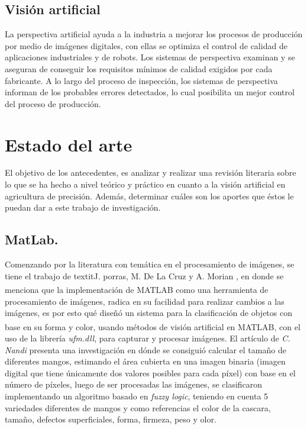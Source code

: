\section{Visión artificial} La perspectiva artificial ayuda a la industria a mejorar los procesos de producción por medio de imágenes digitales, con ellas se optimiza el control de calidad de aplicaciones industriales y de robots. Los sistemas de perspectiva examinan y se aseguran de conseguir los requisitos mínimos de calidad exigidos por cada fabricante. A lo largo del proceso de inspección, los sistemas de perspectiva informan de los probables errores detectados, lo cual posibilita un mejor control del proceso de producción.

\chapter{Estado del arte}

	El objetivo de los antecedentes, es analizar y realizar una revisión literaria sobre lo  que  se  ha hecho  a  nivel  teórico  y  práctico  en  cuanto a  la visión artificial en agricultura de precisión.  Además,  determinar  cuáles son los aportes que éstos le puedan dar a este trabajo de investigación.


\section{MatLab.}

	Comenzando por la literatura con temática en el procesamiento de imágenes, se tiene el trabajo de textit{J. porras, M. De La Cruz y A. Morian} \cite{article3}, en donde se menciona que la implementación de MATLAB\textsuperscript{\textregistered} como una herramienta de procesamiento de imágenes, radica en su facilidad para realizar cambios a las imágenes, es por esto qué diseñó un sistema para la clasificación de objetos con base en su forma y color, usando métodos de visión artificial en MATLAB\textsuperscript{\textregistered}, con el uso de la librería \textit{ufm.dll}, para capturar y procesar imágenes. El artículo de \textit{C. Nandi} \cite{inproceedings} presenta una investigación en dónde se consiguió calcular el tamaño de diferentes mangos, estimando el área cubierta en una imagen binaria (imagen digital que tiene únicamente dos valores posibles para cada píxel) con base en el número de píxeles, luego de ser procesadas las imágenes, se clasificaron implementando un algoritmo basado en \textit{fuzzy logic}, teniendo en cuenta 5 variedades diferentes de mangos y como referencias el color de la cascara, tamaño, defectos superficiales, forma, firmeza, peso y olor.\\

